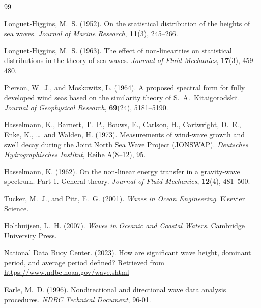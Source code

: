 \documentclass[journal,10pt,twocolumn]{IEEEtran}
\begin{document}
    \begin{thebibliography}{99}

        Longuet-Higgins, M.~S. (1952).
        On the statistical distribution of the heights of sea waves.
        \textit{Journal of Marine Research}, \textbf{11}(3), 245--266.

        Longuet-Higgins, M.~S. (1963).
        The effect of non-linearities on statistical distributions in the theory of sea waves.
        \textit{Journal of Fluid Mechanics}, \textbf{17}(3), 459--480.

        Pierson, W.~J., and Moskowitz, L. (1964).
        A proposed spectral form for fully developed wind seas based on the similarity theory of S.~A.~Kitaigorodskii.
        \textit{Journal of Geophysical Research}, \textbf{69}(24), 5181--5190.

        Hasselmann, K., Barnett, T.~P., Bouws, E., Carlson, H., Cartwright, D.~E., Enke, K., \ldots\ and Walden, H. (1973).
        Measurements of wind-wave growth and swell decay during the Joint North Sea Wave Project (JONSWAP).
        \textit{Deutsches Hydrographisches Institut}, Reihe A(8--12), 95.

        Hasselmann, K. (1962).
        On the non-linear energy transfer in a gravity-wave spectrum. Part 1. General theory.
        \textit{Journal of Fluid Mechanics}, \textbf{12}(4), 481--500.

        Tucker, M.~J., and Pitt, E.~G. (2001).
        \textit{Waves in Ocean Engineering}.
        Elsevier Science.

        Holthuijsen, L.~H. (2007).
        \textit{Waves in Oceanic and Coastal Waters}.
        Cambridge University Press.

        National Data Buoy Center. (2023).
        How are significant wave height, dominant period, and average period defined?
        Retrieved from \url{https://www.ndbc.noaa.gov/wave.shtml}

        Earle, M.~D. (1996).
        Nondirectional and directional wave data analysis procedures.
        \textit{NDBC Technical Document}, 96-01.

    \end{thebibliography}
\end{document}
